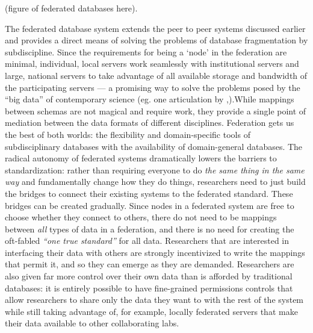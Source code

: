 \documentclass[nohyper]{tufte-book-jls}
\begin{document}
(figure of federated databases here).

The federated database system extends the peer to peer systems discussed
earlier and provides a direct means of solving the problems of database
fragmentation by subdiscipline. Since the requirements for being a
`node' in the federation are minimal, individual, local servers work
seamlessly with institutional servers and large, national servers to
take advantage of all available storage and bandwidth of the
participating servers --- a promising way to solve the problems posed by
the ``big data'' of contemporary science (eg. one articulation by \cite{charlesCommunityDrivenBigOpen2020},).While mappings between
schemas are not magical and require work, they provide a single point of
mediation between the data formats of different disciplines. Federation
gets us the best of both worlds: the flexibility and domain-specific
tools of subdisciplinary databases with the availability of
domain-general databases. The radical autonomy of federated systems
dramatically lowers the barriers to standardization: rather than
requiring everyone to do \emph{the same thing in the same way} and
fundamentally change how they do things, researchers need to just build
the bridges to connect their existing systems to the federated standard.
These bridges can be created gradually. Since nodes in a federated
system are free to choose whether they connect to others, there do not
need to be mappings between \emph{all} types of data in a federation,
and there is no need for creating the oft-fabled \emph{``one true
standard''} for all data. Researchers that are interested in interfacing
their data with others are strongly incentivized to write the mappings
that permit it, and so they can emerge as they are demanded. Researchers
are also given far more control over their own data than is afforded by
traditional databases: it is entirely possible to have fine-grained
permissions controls that allow researchers to share only the data they
want to with the rest of the system while still taking advantage of, for
example, locally federated servers that make their data available to
other collaborating labs.
\end{document}
